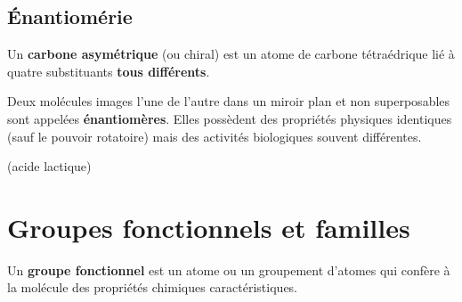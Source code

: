 \subsection{Énantiomérie}

\begin{definition}
Un \textbf{carbone asymétrique} (ou chiral) est un atome de carbone tétraédrique lié à quatre substituants \textbf{tous différents}.
\end{definition}

\begin{definition}[Énantiomères]
Deux molécules images l'une de l'autre dans un miroir plan et non superposables sont appelées \textbf{énantiomères}. Elles possèdent des propriétés physiques identiques (sauf le pouvoir rotatoire) mais des activités biologiques souvent différentes.
\end{definition}

\begin{exemple}
\begin{center}
\begin{illus}
 \quad (acide lactique)
\end{illus}
\end{center}
\end{exemple}

\section{Groupes fonctionnels et familles}

\begin{definition}
Un \textbf{groupe fonctionnel} est un atome ou un groupement d'atomes qui confère à la molécule des propriétés chimiques caractéristiques.
\end{definition}

